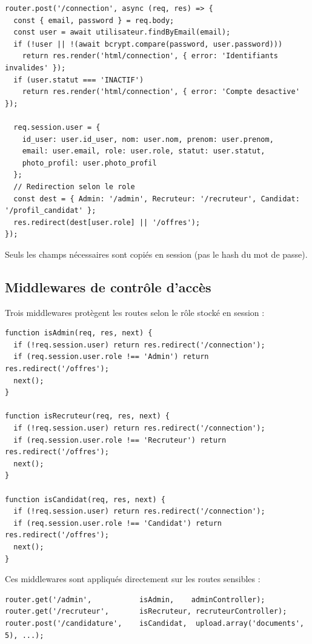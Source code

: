 \documentclass[12pt,a4paper]{article}
\begin{document}
\begin{lstlisting}
router.post('/connection', async (req, res) => {
  const { email, password } = req.body;
  const user = await utilisateur.findByEmail(email);
  if (!user || !(await bcrypt.compare(password, user.password)))
    return res.render('html/connection', { error: 'Identifiants invalides' });
  if (user.statut === 'INACTIF')
    return res.render('html/connection', { error: 'Compte desactive' });

  req.session.user = {
    id_user: user.id_user, nom: user.nom, prenom: user.prenom,
    email: user.email, role: user.role, statut: user.statut,
    photo_profil: user.photo_profil
  };
  // Redirection selon le role
  const dest = { Admin: '/admin', Recruteur: '/recruteur', Candidat: '/profil_candidat' };
  res.redirect(dest[user.role] || '/offres');
});
\end{lstlisting}

Seuls les champs nécessaires sont copiés en session (pas le hash du mot de passe).

\subsection{Middlewares de contrôle d'accès}

Trois middlewares protègent les routes selon le rôle stocké en session :

\begin{lstlisting}
function isAdmin(req, res, next) {
  if (!req.session.user) return res.redirect('/connection');
  if (req.session.user.role !== 'Admin') return res.redirect('/offres');
  next();
}

function isRecruteur(req, res, next) {
  if (!req.session.user) return res.redirect('/connection');
  if (req.session.user.role !== 'Recruteur') return res.redirect('/offres');
  next();
}

function isCandidat(req, res, next) {
  if (!req.session.user) return res.redirect('/connection');
  if (req.session.user.role !== 'Candidat') return res.redirect('/offres');
  next();
}
\end{lstlisting}

Ces middlewares sont appliqués directement sur les routes sensibles :

\begin{lstlisting}
router.get('/admin',           isAdmin,    adminController);
router.get('/recruteur',       isRecruteur, recruteurController);
router.post('/candidature',    isCandidat,  upload.array('documents', 5), ...);
\end{lstlisting}
\end{document}
